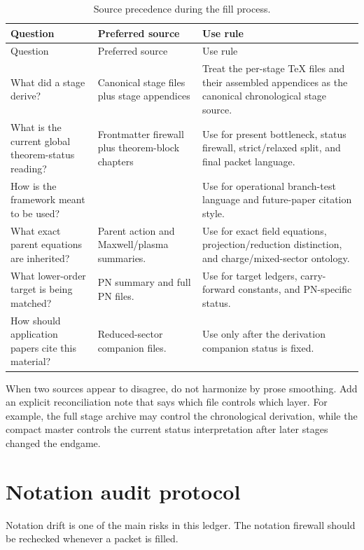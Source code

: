\begin{longtable}{@{}L{0.25\textwidth}L{0.38\textwidth}L{0.27\textwidth}@{}}
\caption{Source precedence during the fill process.}\label{tab:fill-source-precedence}\\
\toprule
Question & Preferred source & Use rule \\
\midrule
\endfirsthead
\toprule
Question & Preferred source & Use rule \\
\midrule
\endhead
What did a stage derive? & Canonical stage files plus stage appendices & Treat the per-stage \TeX{} files and their assembled appendices as the canonical chronological stage source. \\
\addlinespace
What is the current global theorem-status reading? & Frontmatter firewall plus theorem-block chapters & Use for present bottleneck, status firewall, strict/relaxed split, and final packet language. \\
\addlinespace
How is the framework meant to be used? &  & Use for operational branch-test language and future-paper citation style. \\
\addlinespace
What exact parent equations are inherited? & Parent action and Maxwell/plasma summaries. & Use for exact field equations, projection/reduction distinction, and charge/mixed-sector ontology. \\
\addlinespace
What lower-order target is being matched? & PN summary and full PN files. & Use for target ledgers, carry-forward constants, and PN-specific status. \\
\addlinespace
How should application papers cite this material? & Reduced-sector companion files. & Use only after the derivation companion status is fixed. \\
\bottomrule
\end{longtable}

When two sources appear to disagree, do not harmonize by prose smoothing.  Add an explicit reconciliation note that says which file controls which layer.  For example, the full stage archive may control the chronological derivation, while the compact master controls the current status interpretation after later stages changed the endgame.

\section{Notation audit protocol}
\label{sec:notation-audit-protocol}

Notation drift is one of the main risks in this ledger.  The notation firewall should be rechecked whenever a packet is filled.

